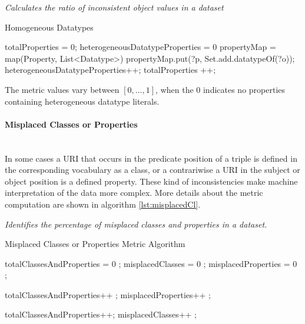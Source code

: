 \begin{mdframed}[style=metricdefinition]
\emph{Calculates the ratio of inconsistent object values in a dataset}
\end{mdframed}

\begin{algorithm}
\caption{Homogeneous Datatypes}\label{lst:heterogeneous}
\begin{algorithmic}[1]
\State totalProperties = 0;
\State heterogeneousDatatypeProperties = 0
\State  propertyMap = map(Property, List<Datatype>)
\EndProcedure
{}
  propertyMap.put(?p, Set.add.datatypeOf(?o)); \EndIf
\EndProcedure
{}
 heterogeneousDatatypeProperties++; 
\EndIf
totalProperties ++;
\EndFor
\EndProcedure
\end{algorithmic}
\end{algorithm}

The metric values vary between $[0,\ldots,1]$, when the 0 indicates no properties containing heterogeneous datatype literals.
  
\paragraph{Misplaced Classes or Properties}~\\
In some cases a URI that occurs in the predicate position of a triple is defined in the corresponding vocabulary as a class, or a contrariwise a URI in the subject or object position is a defined property.
These kind of inconsistencies make machine interpretation of the data more complex.
More details about the metric computation are shown in algorithm \ref{lst:misplacedCl}.

\begin{mdframed}[style=metricdefinition]
\emph{Identifies the percentage of misplaced classes and properties in a dataset.}
\end{mdframed}

\begin{algorithm}
\caption{Misplaced Classes or Properties Metric Algorithm}\label{lst:misplacedCl}
\begin{algorithmic}[1]
\State totalClassesAndProperties = 0 ;
\State misplacedClasses = 0 ;
\State misplacedProperties = 0 ;
\EndProcedure

 totalClassesAndProperties++ ;\EndIf 
{} misplacedProperties++ ; \EndIf 

 totalClassesAndProperties++; \EndIf  
{} misplacedClasses++ ; \EndIf 
{}
\EndProcedure
\end{algorithmic}
\end{algorithm}


